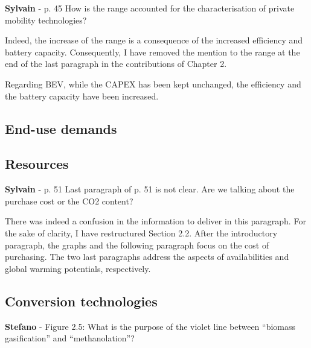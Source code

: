 \documentclass[12pt,a4paper]{article}
\begin{document}
\begin{mdframed}[style=comment] %
{\color{purple} \textbf{Sylvain}} - p. 45 How is the range accounted for the characterisation of private mobility technologies?
\end{mdframed}

\noindent Indeed, the increase of the range is a consequence of the increased efficiency and battery capacity. Consequently, I have removed the mention to the range {\color{blue}at the end of the last paragraph in the contributions of Chapter 2}.

\begin{mdframed}[style=manuscript] %
Regarding BEV, while the CAPEX has been kept unchanged, the efficiency and the battery capacity have been increased. 
\end{mdframed}

\subsection{End-use demands}
\label{methodo_eud}

\subsection{Resources}
\label{methodo_resources}

\begin{mdframed}[style=comment] %
{\color{purple} \textbf{Sylvain}} - p. 51 Last paragraph of p. 51 is not clear. Are we talking about the purchase cost or the CO2 content?
\end{mdframed}

\noindent There was indeed a confusion in the information to deliver in this paragraph. For the sake of clarity, I have restructured Section 2.2. After the introductory paragraph, the graphs and the following paragraph focus on the cost of purchasing. The two last paragraphs address the aspects of availabilities and global warming potentials, respectively.

\subsection{Conversion technologies}
\label{methodo_technologies}

\begin{mdframed}[style=comment] %
{\color{orange} \textbf{Stefano}} - Figure 2.5: What is the purpose of the violet line between ``biomass gasification'' and ``methanolation''?
\end{mdframed}
\end{document}
